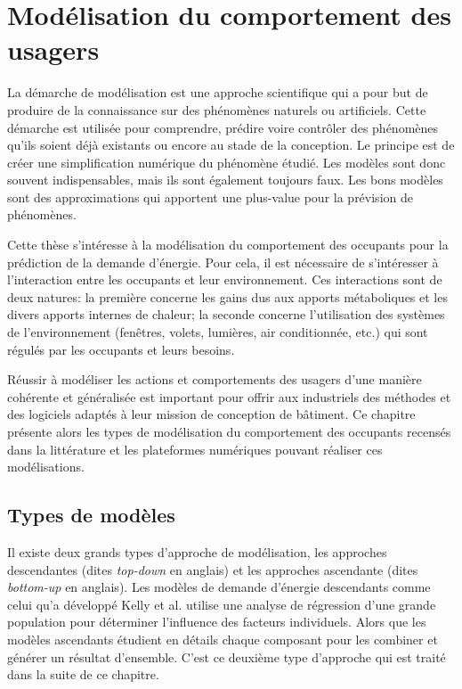 \chapter{Modélisation du comportement des usagers}

La démarche de modélisation est une approche scientifique qui a pour but de produire de la connaissance sur des phénomènes naturels ou artificiels. Cette démarche est utilisée pour comprendre, prédire voire contrôler des phénomènes qu'ils soient déjà existants ou encore au stade de la conception. Le principe est de créer une simplification numérique du phénomène étudié. Les modèles sont donc souvent indispensables, mais ils sont également toujours faux. Les bons modèles sont des approximations qui apportent une plus-value pour la prévision de phénomènes.

Cette thèse s'intéresse à la modélisation du comportement des occupants pour la prédiction de la demande d'énergie. Pour cela, il est nécessaire de s'intéresser à l'interaction entre les occupants et leur environnement. Ces interactions sont de deux natures: la première concerne les gains dus aux apports métaboliques et les divers apports internes de chaleur; la seconde concerne l'utilisation des systèmes de l'environnement (fenêtres, volets, lumières, air conditionnée, etc.) qui sont régulés par les occupants et leurs besoins.

Réussir à modéliser les actions et comportements des usagers d'une manière cohérente et généralisée est important pour offrir aux industriels des méthodes et des logiciels adaptés à leur mission de conception de bâtiment. Ce chapitre présente alors les types de modélisation du comportement des occupants recensés dans la littérature et les plateformes numériques pouvant réaliser ces modélisations. 

\section{Types de modèles}

Il existe deux grands types d'approche de modélisation, les approches descendantes (dites \textit{top-down} en anglais) et les approches ascendante (dites \textit{bottom-up} en anglais). Les modèles de demande d'énergie descendants comme celui qu'a développé Kelly et al. \cite{Kelly-13} utilise une analyse de régression d'une grande population pour déterminer l'influence des facteurs individuels. Alors que les modèles ascendants étudient en détails chaque composant pour les combiner et générer un résultat d'ensemble. C'est ce deuxième type d'approche qui est traité dans la suite de ce chapitre.

